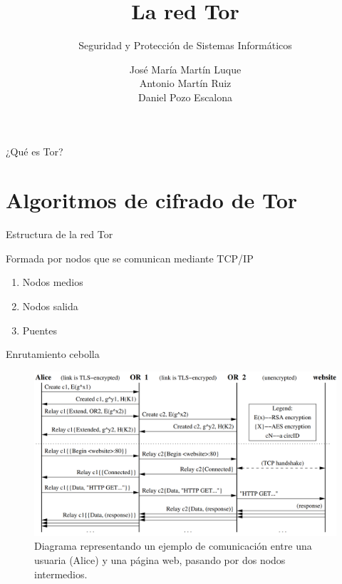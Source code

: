 \documentclass[spanish]{beamer}
\title{La red Tor}
\subtitle{Seguridad y Protección de Sistemas Informáticos}
\author{
  José María Martín Luque \texorpdfstring{\\}{}
  Antonio Martín Ruiz \texorpdfstring{\\}{}
  Daniel Pozo Escalona
}
\begin{document}
\maketitle

\begin{frame}{¿Qué es Tor?}

\end{frame}

\section{Algoritmos de cifrado de Tor}

\begin{frame}{Estructura de la red Tor}

Formada por nodos que se comunican mediante TCP/IP

  \begin{enumerate}

    \item Nodos medios

    \item Nodos salida

    \item Puentes

  \end{enumerate}

\end{frame}

\begin{frame}{Enrutamiento cebolla}

\begin{figure}[h]
  \includegraphics[width=\textwidth]{OR5.png}
  \caption{Diagrama representando un ejemplo de comunicación entre una usuaria (Alice) y una página web, pasando por dos nodos intermedios.}
  \label{fig:or5}
\end{figure}

\end{frame}
\end{document}
